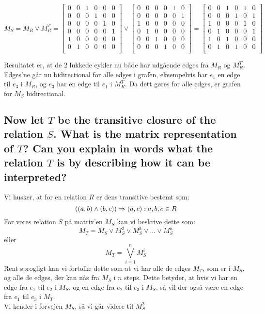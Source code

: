 \documentclass[a4paper,12pt]{article}
\begin{document}
\[M_S = M_R \lor M_{R}^T = 
    \begin{bmatrix}
        0 & 0 & 1 & 0 & 0 & 0 \\
        0 & 0 & 0 & 1 & 0 & 0 \\
        0 & 0 & 0 & 0 & 1 & 0 \\
        0 & 0 & 0 & 0 & 0 & 1 \\
        1 & 0 & 0 & 0 & 0 & 0 \\
        0 & 1 & 0 & 0 & 0 & 0 \\
    \end{bmatrix}
    \lor
    \begin{bmatrix}
        0 & 0 & 0 & 0 & 1 & 0 \\
        0 & 0 & 0 & 0 & 0 & 1 \\
        1 & 0 & 0 & 0 & 0 & 0 \\
        0 & 1 & 0 & 0 & 0 & 0 \\
        0 & 0 & 1 & 0 & 0 & 0 \\
        0 & 0 & 0 & 1 & 0 & 0 \\
    \end{bmatrix}
    = 
    \begin{bmatrix}
        0 & 0 & 1 & 0 & 1 & 0 \\
        0 & 0 & 0 & 1 & 0 & 1 \\
        1 & 0 & 0 & 0 & 1 & 0 \\
        0 & 1 & 0 & 0 & 0 & 1 \\
        1 & 0 & 1 & 0 & 0 & 0 \\
        0 & 1 & 0 & 1 & 0 & 0 \\
    \end{bmatrix}
\]

Resultatet er, at de 2 lukkede cykler nu både har udgående edges fra $M_R$ og $M^T_{R}$. Edges'ne går nu bidirectional for alle edges i grafen, eksempelvis har $e_1$ en edge til $e_3$ i $M_R$, og $e_3$ har en edge til $e_1$ i $M^T_{R}$. Da dett gøres for alle edges, er grafen for $M_S$ bidirectional.

\subsection[]{Now let $T$ be the transitive closure of the relation $S$. What is the matrix representation of $T$? 
Can you explain in words what the relation $T$ is by describing how it can be interpreted?
}

Vi husker, at for en relation $R$ er dens transitive bestemt som: 
\[\left( (a,b) \wedge (b,c)\right) \Rightarrow (a,c) : a,b,c \in R\]
For vores relation $S$ på matrix'en $M_S$ kan vi beskrive dette som:
\[M_T = M_S \lor M^2_S \lor M^3_S \lor \dots \lor M^n_S\]
eller
\[M_T =\bigvee \limits_{i=1}^{n} M^i_S\]
Rent sprogligt kan vi fortolke dette som at vi har alle de edges $M_T$, som er i $M_S$, og alle de edges, der kan nås fra $M_S$ i $n$ steps. Dette betyder, at hvis vi har en edge fra $e_1$ til $e_2$ i $M_S$, og en edge fra $e_2$ til $e_3$ i $M_S$, så vil der også være en edge fra $e_1$ til $e_3$ i $M_T$.\\
Vi kender i forvejen $M_S$, så vi går videre til $M^2_S$
\end{document}
